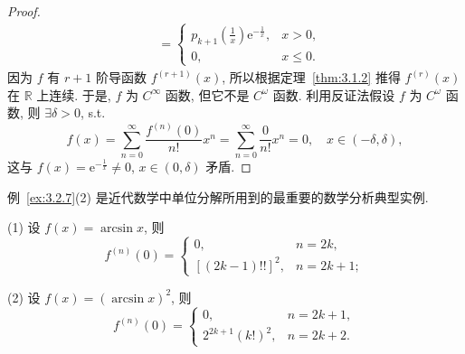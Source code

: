 \begin{proof}
\[\begin{aligned}
&= \begin{cases}p_{k+1}\left(\frac{1}{x}\right)\mathrm{e}^{-\frac{1}{x}}, & x > 0,\\ 0, & x \leqslant 0.\end{cases}
\end{aligned}
\]
因为 $f$ 有 $r+1$ 阶导函数 $f^{(r+1)}(x)$, 所以根据定理~\ref{thm:3.1.2} 推得 $f^{(r)}(x)$ 在 $\mathbb{R}$ 上连续. 于是, $f$ 为 $C^{\infty}$ 函数, 但它不是 $C^{\omega}$ 函数. 利用反证法假设 $f$ 为 $C^{\omega}$ 函数, 则 $\exists \delta > 0$, s.t.
\[
f(x) = \sum_{n=0}^{\infty}\frac{f^{(n)}(0)}{n!}x^{n} = \sum_{n=0}^{\infty}\frac{0}{n!}x^{n} = 0,\quad x \in (-\delta, \delta),
\]
这与 $f(x) = \mathrm{e}^{-\frac{1}{x}} \neq 0$, $x \in (0, \delta)$ 矛盾.
\end{proof}

\begin{remark}\label{rem:3.2.1}
例~\ref{ex:3.2.7}(2) 是近代数学中单位分解所用到的最重要的数学分析典型实例.
\end{remark}

\begin{example}\label{ex:3.2.8}
(1) 设 $f(x) = \arcsin x$, 则
\[
f^{(n)}(0) = \begin{cases}0, & n = 2k,\\ [(2k-1)!!]^{2}, & n = 2k+1;\end{cases}
\]

(2) 设 $f(x) = (\arcsin x)^{2}$, 则
\[
f^{(n)}(0) = \begin{cases}0, & n = 2k+1,\\ 2^{2k+1}(k!)^{2}, & n = 2k+2.\end{cases}
\]
\end{example}

